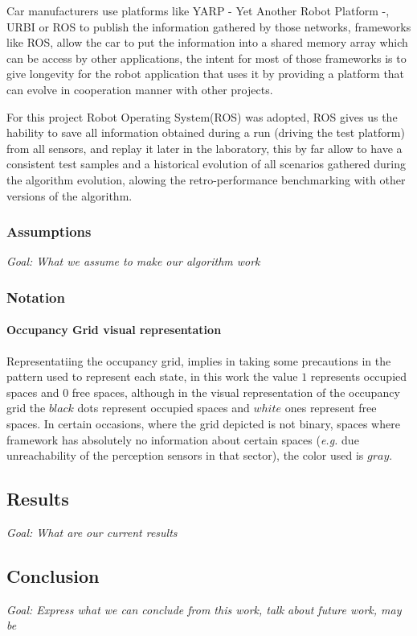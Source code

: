 Car manufacturers use platforms like YARP - Yet Another Robot Platform -, URBI or ROS to publish the information gathered by those networks, frameworks like ROS, allow the car to put the information into a shared memory array which can be access by other applications, the intent for most of those frameworks is to give longevity\cite{Fitzpatrick:2008:TLR:1327539.1327705} for the robot application that uses it by providing a platform that can evolve in cooperation manner with other projects.

For this project Robot Operating System(ROS) was adopted, ROS gives us the hability to save all information obtained during a run (driving the test platform) from all sensors, and replay it later in the laboratory, this by far allow to have a consistent test samples and a historical evolution of all scenarios gathered during the algorithm evolution, alowing the retro-performance benchmarking with other versions of the algorithm.

\subsubsection*{Assumptions}

\textit{Goal: What we assume to make our algorithm work}

\subsubsection*{Notation}

\paragraph{Occupancy Grid visual representation}

Representatiing the occupancy grid, implies in taking some precautions in the pattern used to represent each state, in this work the value $1$ represents occupied spaces and $0$ free spaces, although in the visual representation of the occupancy grid the $black$ dots represent occupied spaces and $white$ ones represent free spaces. In certain occasions, where the grid depicted is not binary, spaces where framework has absolutely no information about certain spaces (\textit{e.g.} due unreachability of the perception sensors in that sector), the color used is $gray$.

\subsection{Results}

\textit{Goal: What are our current results}

\subsection{Conclusion}

\textit{Goal: Express what we can conclude from this work, talk about future work, may be}